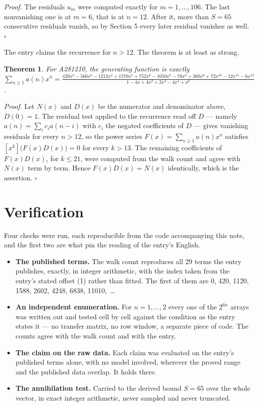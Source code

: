 \documentclass[11pt]{article}
\newtheorem{theorem}{Theorem}
\theoremstyle{definition}
\begin{document}
{\itshape Proof.} The residuals $u_m$ were computed exactly for $m = 1,\dots,106$. The last nonvanishing one is at $m = 6$, that is at $n = 12$. After it, more than $S = 65$ consecutive residuals vanish, so by Section 5 every later residual vanishes as well. $\square$

The entry claims the recurrence for $n > 12$. The theorem is at least as strong.

\begin{theorem} For A281210, the generating function is exactly $\sum_{n\ge 1} a(n)x^n = \frac{420x^{2} - 560x^{3} - 1212x^{4} + 1570x^{5} + 752x^{6} - 1050x^{7} - 78x^{8} + 360x^{9} + 72x^{10} - 12x^{11} - 6x^{12}}{1 - 4x + 4x^{2} + 2x^{3} - 4x^{4} + x^{6}}$.\end{theorem}

{\itshape Proof.} Let $N(x)$ and $D(x)$ be the numerator and denominator above, $D(0)=1$. The residual test applied to the recurrence read off $D$ --- namely $a(n) = \sum_i c_i a(n-i)$ with $c_i$ the negated coefficients of $D$ --- gives vanishing residuals for every $n > 12$, so the power series $F(x)=\sum_{n\ge 1}a(n)x^n$ satisfies $[x^k]\bigl(F(x)D(x)\bigr) = 0$ for every $k > 13$. The remaining coefficients of $F(x)D(x)$, for $k \le 21$, were computed from the walk count and agree with $N(x)$ term by term. Hence $F(x)D(x) = N(x)$ identically, which is the assertion. $\square$

\section{Verification}

Four checks were run, each reproducible from the code accompanying this note, and the first two are what pin the reading of the entry's English.

\begin{itemize}

\item {\bfseries The published terms.} The walk count reproduces all 29 terms the entry publishes, exactly, in integer arithmetic, with the index taken from the entry's stated offset (1) rather than fitted. The first of them are 0, 420, 1120, 1588, 2602, 4248, 6838, 11010,~\dots

\item {\bfseries An independent enumeration.} For $n = 1,\dots,2$ every one of the $2^{6n}$ arrays was written out and tested cell by cell against the condition as the entry states it --- no transfer matrix, no row window, a separate piece of code. The counts agree with the walk count and with the entry.

\item {\bfseries The claim on the raw data.} Each claim was evaluated on the entry's published terms alone, with no model involved, wherever the proved range and the published data overlap. It holds there.

\item {\bfseries The annihilation test.} Carried to the derived bound $S = 65$ over the whole vector, in exact integer arithmetic, never sampled and never truncated.

\end{itemize}
\end{document}
